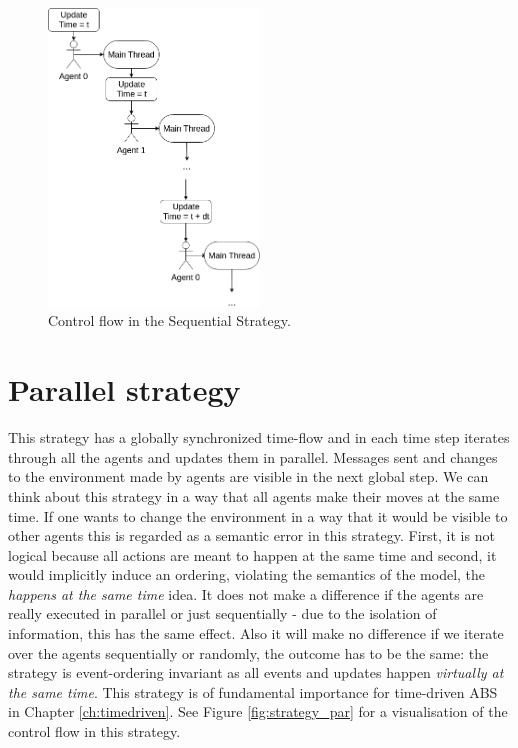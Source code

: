 \begin{figure}[H]
	\centering
	\includegraphics[width=0.5\textwidth, angle=0]{./fig/implabs/sequential.png}
	\caption{Control flow in the Sequential Strategy.}
	\label{fig:strategy_seq}
\end{figure}

\section{Parallel strategy}
\label{sub:par_strategy}
This strategy has a globally synchronized time-flow and in each time step iterates through all the agents and updates them in parallel. Messages sent and changes to the environment made by agents are visible in the next global step. We can think about this strategy in a way that all agents make their moves at the same time.  If one wants to change the environment in a way that it would be visible to other agents this is regarded as a semantic error in this strategy. First, it is not logical because all actions are meant to happen at the same time and second, it would implicitly induce an ordering, violating the semantics of the model, the \textit{happens at the same time} idea.
It does not make a difference if the agents are really executed in parallel or just sequentially - due to the isolation of information, this has the same effect. Also it will make no difference if we iterate over the agents sequentially or randomly, the outcome has to be the same: the strategy is event-ordering invariant as all events and updates happen \textit{virtually at the same time}. This strategy is of fundamental importance for time-driven ABS in Chapter \ref{ch:timedriven}. See Figure \ref{fig:strategy_par} for a visualisation of the control flow in this strategy.

